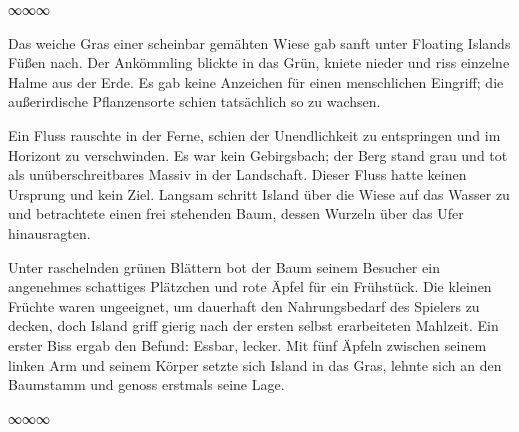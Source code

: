 \begin{center}
∞∞∞
\end{center}

Das weiche Gras einer scheinbar gemähten Wiese gab sanft unter Floating Islands Füßen nach. Der Ankömmling blickte in das Grün, kniete nieder und riss einzelne Halme aus der Erde. Es gab keine Anzeichen für einen menschlichen Eingriff; die außerirdische Pflanzensorte schien tatsächlich so zu wachsen.

Ein Fluss rauschte in der Ferne, schien der Unendlichkeit zu entspringen und im Horizont zu verschwinden. Es war kein Gebirgsbach; der Berg stand grau und tot als unüberschreitbares Massiv in der Landschaft. Dieser Fluss hatte keinen Ursprung und kein Ziel. Langsam schritt Island über die Wiese auf das Wasser zu und betrachtete einen frei stehenden Baum, dessen Wurzeln über das Ufer hinausragten.

Unter raschelnden grünen Blättern bot der Baum seinem Besucher ein angenehmes schattiges Plätzchen und rote Äpfel für ein Frühstück. Die kleinen Früchte waren ungeeignet, um dauerhaft den Nahrungsbedarf des Spielers zu decken, doch Island griff gierig nach der ersten selbst erarbeiteten Mahlzeit. Ein erster Biss ergab den Befund: Essbar, lecker. Mit fünf Äpfeln zwischen seinem linken Arm und seinem Körper setzte sich Island in das Gras, lehnte sich an den Baumstamm und genoss erstmals seine Lage.

\begin{center}
∞∞∞
\end{center}

